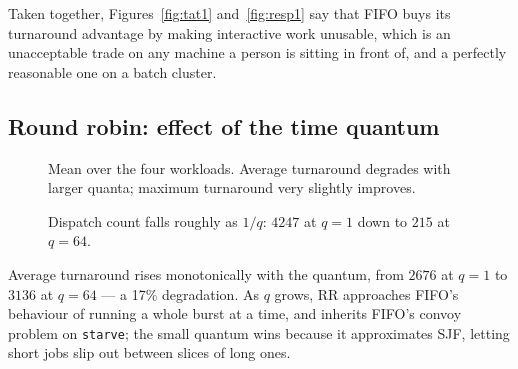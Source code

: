 \documentclass[11pt,a4paper]{article}
\begin{document}
Taken together, Figures~\ref{fig:tat1} and~\ref{fig:resp1} say that FIFO buys
its turnaround advantage by making interactive work unusable, which is an
unacceptable trade on any machine a person is sitting in front of, and a
perfectly reasonable one on a batch cluster.

\subsection{Round robin: effect of the time quantum}

\begin{figure}[h]
\centering
{}
\caption{Mean over the four workloads. Average turnaround degrades with larger
quanta; maximum turnaround very slightly improves.}
\label{fig:rrq}
\end{figure}

\begin{figure}[h]
\centering
{}
\caption{Dispatch count falls roughly as $1/q$: $4247$ at $q{=}1$ down to
$215$ at $q{=}64$.}
\label{fig:rrsw}
\end{figure}

Average turnaround rises monotonically with the quantum, from $2676$ at
$q{=}1$ to $3136$ at $q{=}64$ --- a 17\% degradation. As $q$ grows, RR
approaches FIFO's behaviour of running a whole burst at a time, and inherits
FIFO's convoy problem on \texttt{starve}; the small quantum wins because it
approximates SJF, letting short jobs slip out between slices of long ones.
\end{document}
